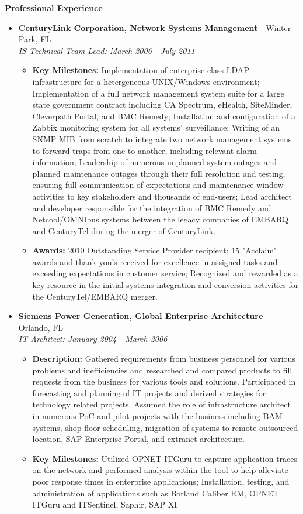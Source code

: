 \documentclass[10pt,oneside]{article}
\newenvironment{ressection}[1]{
	\vspace{4pt}
	\textbf{\selectfont\normalsize#1}
	\begin{itemize}
	\vspace{3pt}
}{
	\end{itemize}
}
\newcommand{\ressubitem}[1]{
	\vspace{-1pt}
	\item \begin{flushleft} #1 \end{flushleft}
}
\newcommand{\resbigitem}[3]{
	\vspace{-5pt}
	\item
	\textbf{#1} - #2 \\
	\textit{#3}
}
\newenvironment{ressubsec}[3]{
	\resbigitem{#1}{#2}{#3}
	\vspace{-2pt}
	\begin{itemize}
}{
	\end{itemize}
}
\begin{document}
\begin{ressection}{Professional Experience}
\begin{ressubsec}{CenturyLink Corporation, Network Systems Management}{Winter Park, FL}{IS Technical Team Lead: March 2006 - July 2011}
		\ressubitem{\textbf{Key Milestones:} Implementation of enterprise class LDAP infrastructure for a hetergeneous UNIX/Windows environment; Implementation of a full network management system suite for a large state government contract including CA Spectrum, eHealth, SiteMinder, Cleverpath Portal, and BMC Remedy; Installation and configuration of a Zabbix monitoring system for all systems' surveillance; Writing of an SNMP MIB from scratch to integrate two network management systems to forward traps from one to another, including relevant alarm information; Leadership of numerous unplanned system outages and planned maintenance outages through their full resolution and testing, ensuring full communication of expectations and maintenance window activities to key stakeholders and thousands of end-users; Lead architect and developer responsible for the integration of BMC Remedy and Netcool/OMNIbus systems between the legacy companies of EMBARQ and CenturyTel during the merger of CenturyLink.}
		
		\ressubitem{\textbf{Awards:} 2010 Outstanding Service Provider recipient; 15 "Acclaim" awards and thank-you's received for excellence in assigned tasks and exceeding expectations in customer service; Recognized and rewarded as a key resource in the initial systems integration and conversion activities for the CenturyTel/EMBARQ merger.}

	\end{ressubsec}

	\begin{ressubsec}{Siemens Power Generation, Global Enterprise Architecture}{Orlando, FL}{IT Architect: January 2004 - March 2006}

		\ressubitem{\textbf{Description:} Gathered requirements from business personnel for various problems and inefficiencies and researched and compared products to fill requests from the business for various tools and solutions.  Participated in forecasting and planning of IT projects and derived strategies for technology related projects.  Assumed the role of infrastructure architect in numerous PoC and pilot projects with the business including BAM systems, shop floor scheduling, migration of systems to remote outsourced location, SAP Enterprise Portal, and extranet architecture.}

		\ressubitem{\textbf{Key Milestones:} Utilized OPNET ITGuru to capture application traces on the network and performed analysis within the tool to help alleviate poor response times in enterprise applications; Installation, testing, and administration of applications such as Borland Caliber RM, OPNET ITGuru and ITSentinel, Saphir, SAP XI}
		

\end{ressubsec}
\end{ressection}
\end{document}

